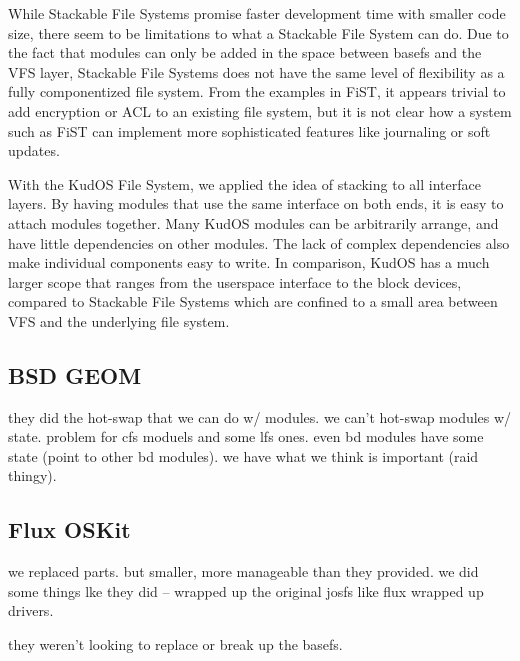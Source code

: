 While Stackable File Systems promise faster development time with smaller code
size, there seem to be limitations to what a Stackable File System can do.
Due to the fact that modules can only be added in the space between basefs and
the VFS layer, Stackable File Systems does not have the same level of
flexibility as a fully componentized file system. From the examples in FiST, it
appears trivial to add encryption or ACL to an existing file system, but it is
not clear how a system such as FiST can implement more sophisticated features
like journaling or soft updates.

With the KudOS File System, we applied the idea of stacking to all interface
layers. By having modules that use the same interface on both ends, it is easy
to attach modules together. Many KudOS modules can be arbitrarily arrange, and
have little dependencies on other modules. The lack of complex dependencies also
make individual components easy to write. In comparison, KudOS has a much larger
scope that ranges from the userspace interface to the block devices, compared to
Stackable File Systems which are confined to a small area between VFS and the
underlying file system.

\subsection{BSD GEOM}
\label{sec:related:geom}

they did the hot-swap that we can do w/ modules. we can't hot-swap
modules w/ state. problem for cfs moduels and some lfs ones. even bd
modules have some state (point to other bd modules). we have what we
think is important (raid thingy).

\subsection{Flux OSKit}

\cite{ford97oskit}
we replaced parts. but smaller, more manageable than they provided. we
did some things lke they did -- wrapped up the original josfs like
flux wrapped up drivers.

they weren't looking to replace or break up the basefs.
